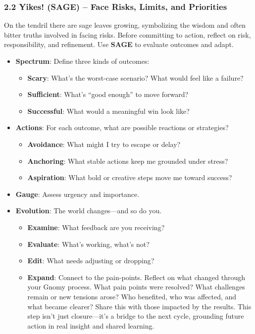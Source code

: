 \documentclass{article}
\begin{document}
\subsubsection{2.2 Yikes! (SAGE) – Face Risks, Limits, and Priorities}
On the tendril there are sage leaves growing, symbolizing the wisdom and often bitter truths involved in facing risks. Before committing to action, reflect on risk, responsibility, and refinement. Use \textbf{SAGE} to evaluate outcomes and adapt.
\begin{itemize}[noitemsep,topsep=0pt]
    \item \textbf{Spectrum}: Define three kinds of outcomes:
    \begin{itemize}[noitemsep,topsep=0pt]
        \item \textbf{Scary}: What's the worst-case scenario? What would feel like a failure?
        \item \textbf{Sufficient}: What's ``good enough'' to move forward?
        \item \textbf{Successful}: What would a meaningful win look like?
    \end{itemize}
    \item \textbf{Actions}: For each outcome, what are possible reactions or strategies?
    \begin{itemize}[noitemsep,topsep=0pt]
        \item \textbf{Avoidance}: What might I try to escape or delay?
        \item \textbf{Anchoring}: What stable actions keep me grounded under stress?
        \item \textbf{Aspiration}: What bold or creative steps move me toward success?
    \end{itemize}
    \item \textbf{Gauge}: Assess urgency and importance.
    \item \textbf{Evolution}: The world changes—and so do you.
    \begin{itemize}[noitemsep,topsep=0pt]
        \item \textbf{Examine}: What feedback are you receiving?
        \item \textbf{Evaluate}: What's working, what's not?
        \item \textbf{Edit}: What needs adjusting or dropping?
        \item \textbf{Expand}: Connect to the pain-points. Reflect on what changed through your Gnomy process. What pain points were resolved? What challenges remain or new tensions arose? Who benefited, who was affected, and what became clearer? Share this with those impacted by the results. This step isn't just closure—it's a bridge to the next cycle, grounding future action in real insight and shared learning.
    \end{itemize}
\end{itemize}
\end{document}
